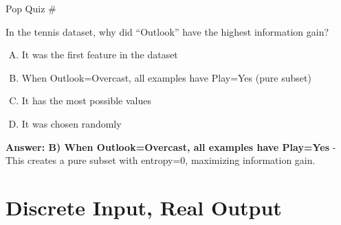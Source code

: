 \documentclass[usenames,dvipsnames]{beamer}
\newcounter{popquiz}
\begin{document}
\begin{frame}{Pop Quiz \#\thepopquiz}
\begin{tcolorbox}[colback=blue!5!white,colframe=blue!75!black,title=Quick Question!]
In the tennis dataset, why did ``Outlook'' have the highest information gain?
\begin{enumerate}[A)]
\item It was the first feature in the dataset
\item When Outlook=Overcast, all examples have Play=Yes (pure subset)
\item It has the most possible values
\item It was chosen randomly
\end{enumerate}
\pause
\textbf{Answer: B) When Outlook=Overcast, all examples have Play=Yes} - This creates a pure subset with entropy=0, maximizing information gain.
\end{tcolorbox}
\end{frame}

\section{Discrete Input, Real Output}
\end{document}
